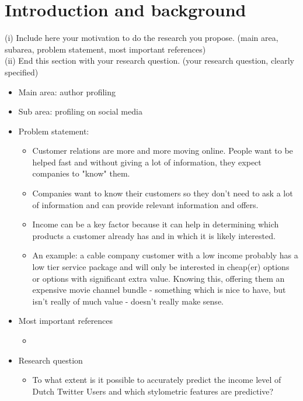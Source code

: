 \documentclass[11pt, a4paper]{article}
\begin{document}
\section{Introduction and background}
(i) Include here your motivation to do the research you propose. (main area, subarea, problem statement, most important references)\\
(ii) End this section with your research question. (your research question, clearly specified)
\begin{itemize}
\item Main area: author profiling
\item Sub area: profiling on social media
\item Problem statement:
\begin{itemize}
\item Customer relations are more and more moving online. People want to be helped fast and without giving a lot of information, they expect companies to "know" them.
\item Companies want to know their customers so they don't need to ask a lot of information and can provide relevant information and offers. 
\item Income can be a key factor because it can help in determining which products a customer already has and in which it is likely interested. 
\item An example: a cable company customer with a low income probably has a low tier service package and will only be interested in cheap(er) options or options with significant extra value. Knowing this, offering them an expensive movie channel bundle - something which is nice to have, but isn't really of much value - doesn't really make sense.
\end{itemize}
\item Most important references
\begin{itemize}
\item{\citet{flekova}}
\end{itemize}

\item Research question
\begin{itemize}
\item{To what extent is it possible to accurately predict the income level of Dutch Twitter Users and which stylometric features are predictive?}
\end{itemize}
\end{itemize}
\end{document}
